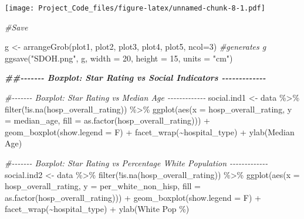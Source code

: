 \documentclass[
]{article}
\newenvironment{Shaded}{\begin{snugshade}}{\end{snugshade}}
\newcommand{\AttributeTok}[1]{\textcolor[rgb]{0.77,0.63,0.00}{#1}}
\newcommand{\CommentTok}[1]{\textcolor[rgb]{0.56,0.35,0.01}{\textit{#1}}}
\newcommand{\DecValTok}[1]{\textcolor[rgb]{0.00,0.00,0.81}{#1}}
\newcommand{\DocumentationTok}[1]{\textcolor[rgb]{0.56,0.35,0.01}{\textbf{\textit{#1}}}}
\newcommand{\FunctionTok}[1]{\textcolor[rgb]{0.00,0.00,0.00}{#1}}
\newcommand{\NormalTok}[1]{#1}
\newcommand{\OtherTok}[1]{\textcolor[rgb]{0.56,0.35,0.01}{#1}}
\newcommand{\SpecialCharTok}[1]{\textcolor[rgb]{0.00,0.00,0.00}{#1}}
\newcommand{\StringTok}[1]{\textcolor[rgb]{0.31,0.60,0.02}{#1}}
\begin{document}
\texttt{[image: Project\_Code\_files/figure-latex/unnamed-chunk-8-1.pdf]}

\begin{Shaded}
\begin{Highlighting}[]
\CommentTok{\#Save}

\NormalTok{g }\OtherTok{\textless{}{-}} \FunctionTok{arrangeGrob}\NormalTok{(plot1, plot2, plot3, plot4, plot5, }\AttributeTok{ncol=}\DecValTok{3}\NormalTok{) }\CommentTok{\#generates g}
\FunctionTok{ggsave}\NormalTok{(}\StringTok{"SDOH.png"}\NormalTok{, g, }\AttributeTok{width =} \DecValTok{20}\NormalTok{, }\AttributeTok{height =} \DecValTok{15}\NormalTok{, }\AttributeTok{units =} \StringTok{"cm"}\NormalTok{)}
\end{Highlighting}
\end{Shaded}

\begin{Shaded}
\begin{Highlighting}[]
\DocumentationTok{\#\#{-}{-}{-}{-}{-}{-}{-} Boxplot: Star Rating vs Social Indicators {-}{-}{-}{-}{-}{-}{-}{-}{-}{-}{-}{-}{-}}

\CommentTok{\#{-}{-}{-}{-}{-}{-}{-} Boxplot: Star Rating vs Median Age {-}{-}{-}{-}{-}{-}{-}{-}{-}{-}{-}{-}{-}}
\NormalTok{social.ind1 }\OtherTok{\textless{}{-}}\NormalTok{ data }\SpecialCharTok{\%\textgreater{}\%} \FunctionTok{filter}\NormalTok{(}\SpecialCharTok{!}\FunctionTok{is.na}\NormalTok{(hosp\_overall\_rating)) }\SpecialCharTok{\%\textgreater{}\%} 
\FunctionTok{ggplot}\NormalTok{(}\FunctionTok{aes}\NormalTok{(}\AttributeTok{x =}\NormalTok{ hosp\_overall\_rating, }\AttributeTok{y =}\NormalTok{ median\_age, }\AttributeTok{fill =} \FunctionTok{as.factor}\NormalTok{(hosp\_overall\_rating))) }\SpecialCharTok{+} 
\FunctionTok{geom\_boxplot}\NormalTok{(}\AttributeTok{show.legend =}\NormalTok{ F)  }\SpecialCharTok{+} \FunctionTok{facet\_wrap}\NormalTok{(}\SpecialCharTok{\textasciitilde{}}\NormalTok{hospital\_type) }\SpecialCharTok{+} 
\FunctionTok{ylab}\NormalTok{(}\StringTok{\textquotesingle{}Median Age\textquotesingle{}}\NormalTok{) }

\CommentTok{\#{-}{-}{-}{-}{-}{-}{-} Boxplot: Star Rating vs Percentage White Population {-}{-}{-}{-}{-}{-}{-}{-}{-}{-}{-}{-}{-}}
\NormalTok{social.ind2 }\OtherTok{\textless{}{-}}\NormalTok{ data }\SpecialCharTok{\%\textgreater{}\%} \FunctionTok{filter}\NormalTok{(}\SpecialCharTok{!}\FunctionTok{is.na}\NormalTok{(hosp\_overall\_rating)) }\SpecialCharTok{\%\textgreater{}\%} 
\FunctionTok{ggplot}\NormalTok{(}\FunctionTok{aes}\NormalTok{(}\AttributeTok{x =}\NormalTok{ hosp\_overall\_rating, }\AttributeTok{y =}\NormalTok{ per\_white\_non\_hisp, }\AttributeTok{fill =} \FunctionTok{as.factor}\NormalTok{(hosp\_overall\_rating))) }\SpecialCharTok{+} 
\FunctionTok{geom\_boxplot}\NormalTok{(}\AttributeTok{show.legend =}\NormalTok{ F) }\SpecialCharTok{+} \FunctionTok{facet\_wrap}\NormalTok{(}\SpecialCharTok{\textasciitilde{}}\NormalTok{hospital\_type) }\SpecialCharTok{+} 
\FunctionTok{ylab}\NormalTok{(}\StringTok{\textquotesingle{}White Pop \%\textquotesingle{}}\NormalTok{) }


\end{Highlighting}
\end{Shaded}
\end{document}

